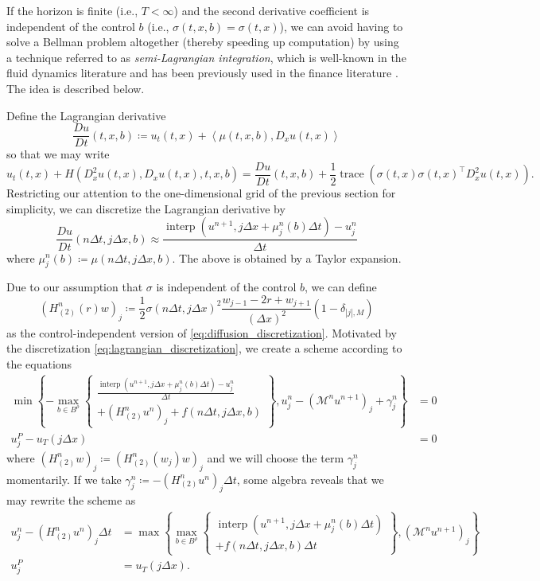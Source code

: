 \documentclass[12pt]{article}
\begin{document}
If the horizon is finite (i.e., $T<\infty$) and the second derivative
coefficient is independent of the control $b$ (i.e., $\sigma(t,x,b)=\sigma(t,x)$),
we can avoid having to solve a Bellman problem altogether (thereby speeding up computation) by using
a technique referred to as \emph{semi-Lagrangian integration}, which
is well-known in the fluid dynamics literature \cite{staniforth1991semi}
and has been previously used in the finance literature \cite{MR2201186}.
The idea is described below.

Define the Lagrangian derivative
\[
\frac{Du}{Dt}(t,x,b)\coloneqq u_{t}(t,x)+\left\langle \mu(t,x,b),D_{x}u(t,x)\right\rangle 
\]
so that we may write
\[
u_{t}(t,x){+}H(D_{x}^{2}u(t,x){,}D_{x}u(t,x){,}t{,}x{,}b){=}\frac{Du}{Dt}(t,x,b){+}\frac{1}{2}{\operatorname{trace}}(\sigma(t,x)\sigma(t,x)^\intercal D_{x}^{2}u(t,x)).
\]
Restricting our attention to the one-dimensional grid of the previous
section for simplicity, we can discretize the Lagrangian derivative
by
\begin{equation}
\frac{Du}{Dt}(n\Delta t,j\Delta x,b)\approx\frac{{\operatorname{interp}}(u^{n+1},j\Delta x+\mu_j^n(b)\Delta t)-u_{j}^{n}}{\Delta t}\label{eq:lagrangian_discretization}
\end{equation}
where $\mu_j^n(b)\coloneqq \mu(n\Delta t,j\Delta x, b)$.
The above is obtained by a Taylor expansion.

Due to our assumption that $\sigma$ is independent of the control
$b$, we can define
\[
(H_{(2)}^{n}(r)w)_{j}\coloneqq\frac{1}{2}\sigma(n\Delta t,j\Delta x)^{2}\frac{w_{j-1}-2r+w_{j+1}}{\left(\Delta x\right)^{2}}\left(1-\delta_{|j|,M}\right)
\]
as the control-independent version of \eqref{eq:diffusion_discretization}.
Motivated by the discretization \eqref{eq:lagrangian_discretization},
we create a scheme according to the equations
\begin{align}
\min\left\{ -\max_{b\in B^{\rho}}\left\{ \begin{gathered}\frac{{\operatorname{interp}}(u^{n+1},j\Delta x+\mu_j^n(b)\Delta t)-u_{j}^{n}}{\Delta t}\\
+(H_{(2)}^{n}u^{n})_{j}+f(n\Delta t,j\Delta x,b)
\end{gathered}
\right\} ,u_{j}^{n}-(\mathcal{M}^{n}u^{n+1})_{j}+\gamma_{j}^{n}\right\}  & =0\nonumber \\
u_{j}^{P}-u_{T}(j\Delta x) & =0\label{eq:semi_lagrangian_scheme}
\end{align}
where $(H_{(2)}^{n}w)_{j}\coloneqq(H_{(2)}^{n}(w_{j})w)_{j}$ and
we will choose the term $\gamma_{j}^{n}$ momentarily. If we take
$\gamma_{j}^{n}\coloneqq-(H_{(2)}^{n}u^{n})_{j}\Delta t$, some algebra
reveals that we may rewrite the scheme as
\begin{align}
u_{j}^{n}-(H_{(2)}^{n}u^{n})_{j}\Delta t & =\max\left\{ \max_{b\in B^{\rho}}\left\{ \begin{gathered}{\operatorname{interp}}(u^{n+1},j\Delta x+\mu_j^n(b)\Delta t)\\
+f(n\Delta t,j\Delta x,b)\Delta t
\end{gathered}
\right\} ,(\mathcal{M}^{n}u^{n+1})_{j}\right\} \nonumber \\
u_{j}^{P} & =u_{T}(j\Delta x).\label{eq:semi_lagrangian_scheme_modified}
\end{align}
\end{document}
